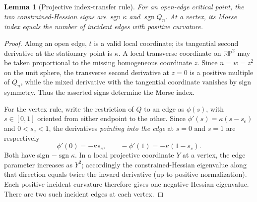 \documentclass[10pt,a4paper]{article}
\theoremstyle{plain}
\newtheorem{lemma}[theorem]{Lemma}
\theoremstyle{remark}
\newcommand{\RP}{\mathbb{RP}}
\newcommand{\sgn}{\operatorname{sgn}}
\begin{document}
\begin{lemma}[Projective index-transfer rule]\label{lem:index}
For an open-edge critical point, the two constrained-Hessian signs are $\sgn\kappa$ and $\sgn Q_n$. At a vertex, its Morse index equals the number of incident edges with positive curvature.
\end{lemma}
\begin{proof}
Along an open edge, $t$ is a valid local coordinate; its tangential second derivative at the stationary point is $\kappa$. A local transverse coordinate on $\RP^2$ may be taken proportional to the missing homogeneous coordinate $z$. Since $n=w=z^2$ on the unit sphere, the transverse second derivative at $z=0$ is a positive multiple of $Q_n$, while the mixed derivative with the tangential coordinate vanishes by sign symmetry. Thus the asserted signs determine the Morse index.

For the vertex rule, write the restriction of $Q$ to an edge as $\phi(s)$, with $s\in[0,1]$ oriented from either endpoint to the other. Since $\phi'(s)=\kappa(s-s_e)$ and $0<s_e<1$, the derivatives \emph{pointing into the edge} at $s=0$ and $s=1$ are respectively
\[
 \phi'(0)=-\kappa s_e,\qquad -\phi'(1)=-\kappa(1-s_e).
\]
Both have sign $-\sgn\kappa$. In a local projective coordinate $Y$ at a vertex, the edge parameter increases as $Y^2$; accordingly the constrained-Hessian eigenvalue along that direction equals twice the inward derivative (up to positive normalization). Each positive incident curvature therefore gives one negative Hessian eigenvalue. There are two such incident edges at each vertex.
\end{proof}
\end{document}
